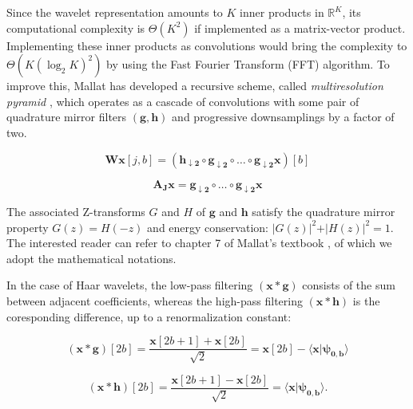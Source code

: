 \documentclass{article}
\begin{document}
Since the wavelet representation amounts to $K$ inner products in $\mathbb{R}^K$,
its computational complexity is $\Theta(K^2)$ if implemented as a matrix-vector product.
Implementing these inner products as convolutions would bring the complexity to
$\Theta{(K (\log_2 K)^2)}$ by using the Fast Fourier Transform (FFT) algorithm.
To improve this, Mallat has developed a recursive scheme, called
\emph{multiresolution pyramid} \cite{mallat1989theory}, which operates as a cascade
of convolutions with some pair of quadrature mirror filters
$(\boldsymbol{g}, \boldsymbol{h})$ and progressive downsamplings by a factor of two.

\begin{equation}
\boldsymbol{Wx}[j,b] =
\left(
\boldsymbol{h_{\downarrow 2}} \circ
\boldsymbol{g_{\downarrow 2}} \circ \ldots \circ
\boldsymbol{g_{\downarrow 2}}\boldsymbol{x}
\right)[b]
\end{equation}

\begin{equation}
\boldsymbol{A_J x} =
\boldsymbol{g_{\downarrow 2}} \circ \ldots \circ
\boldsymbol{g_{\downarrow 2}}\boldsymbol{x}
\end{equation}

The associated Z-transforms $G$ and $H$ of $\boldsymbol{g}$
and $\boldsymbol{h}$ satisfy the quadrature mirror property $G(z) = H(-z)$ and
energy conservation: $\vert G(z) \vert ^2 + \vert H(z) \vert ^2 = 1$.
The interested reader can refer to chapter 7 of Mallat's textbook \cite{mallat2008wavelet},
of which we adopt the mathematical notations.

In the case of Haar wavelets, the low-pass filtering $(\boldsymbol{x} \ast \boldsymbol{g})$
consists of the sum between adjacent coefficients, whereas the high-pass filtering
$(\boldsymbol{x} \ast \boldsymbol{h})$ is the coresponding difference, up to a
renormalization constant:

\begin{equation}
(\boldsymbol{x}
\ast
\boldsymbol{g})[2b]
=
\frac{ \boldsymbol{x}[2b+1] + \boldsymbol{x}[2b]}{\sqrt{2}}
=
\boldsymbol{x}[2b]
-
\langle \boldsymbol{x} \vert \boldsymbol{\psi_{0,b}} \rangle
\end{equation}

\begin{equation}
(\boldsymbol{x}
\ast
\boldsymbol{h})[2b]
=
\frac{ \boldsymbol{x}[2b+1] - \boldsymbol{x}[2b]}{\sqrt{2}}
=
\langle \boldsymbol{x} \vert \boldsymbol{\psi_{0,b}} \rangle.
\end{equation}
\end{document}
